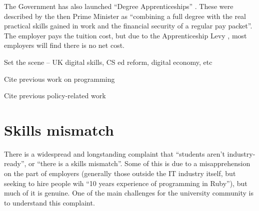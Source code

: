 \documentclass[sigconf]{acmart}
\begin{document}
The Government has also launched ``Degree Apprenticeships'' \cite{BIS2015a}. These were described by the then Prime Minister as ``combining a full degree with the real practical skills gained in work and the financial security of a regular pay packet''. The employer pays the tuition cost, but due to the Apprenticeship Levy \cite{HMRC2016a}, most employers will find there is no net cost.

Set the scene -- UK digital skills, CS ed reform, digital economy, etc

Cite previous work on programming~\cite{davenport-et-al:latice2016,murphy-et-al:programming2017,simon-et-al:sigcse2018}

Cite previous policy-related work~\cite{crick+sentance:2011,brown-et-al:sigcse2013,brown-et-al:toce2014,crick+moller:wipsce2015,moller+crick:jce2018}

\section{Skills mismatch}
There is a widespread and longstanding complaint that ``students aren't industry-ready'', or ``there is a skills mismatch''. Some of this is due to a misapprehension on the part of employers (generally those outside the IT industry itself, but seeking to hire people wih ``10 years experience of programming in Ruby''), but much of it is genuine. One of the main challenges for the university community is to understand this complaint.
\end{document}
